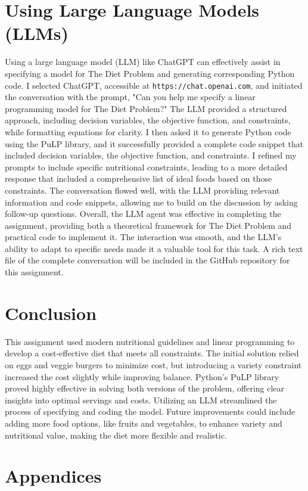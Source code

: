 \documentclass{article}
\begin{document}
\section{Using Large Language Models (LLMs)}
Using a large language model (LLM) like ChatGPT can effectively assist in specifying a model for The Diet Problem and generating corresponding Python code. I selected ChatGPT, accessible at \texttt{https://chat.openai.com}, and initiated the conversation with the prompt, "Can you help me specify a linear programming model for The Diet Problem?" The LLM provided a structured approach, including decision variables, the objective function, and constraints, while formatting equations for clarity. I then asked it to generate Python code using the PuLP library, and it successfully provided a complete code snippet that included decision variables, the objective function, and constraints. I refined my prompts to include specific nutritional constraints, leading to a more detailed response that included a comprehensive list of ideal foods based on those constraints. The conversation flowed well, with the LLM providing relevant information and code snippets, allowing me to build on the discussion by asking follow-up questions. Overall, the LLM agent was effective in completing the assignment, providing both a theoretical framework for The Diet Problem and practical code to implement it. The interaction was smooth, and the LLM's ability to adapt to specific needs made it a valuable tool for this task. A rich text file of the complete conversation will be included in the GitHub repository for this assignment.

\section{Conclusion}
This assignment used modern nutritional guidelines and linear programming to develop a cost-effective diet that meets all constraints. The initial solution relied on eggs and veggie burgers to minimize cost, but introducing a variety constraint increased the cost slightly while improving balance. Python's PuLP library proved highly effective in solving both versions of the problem, offering clear insights into optimal servings and costs. Utilizing an LLM streamlined the process of specifying and coding the model. Future improvements could include adding more food options, like fruits and vegetables, to enhance variety and nutritional value, making the diet more flexible and realistic.

\section{Appendices}
\end{document}
